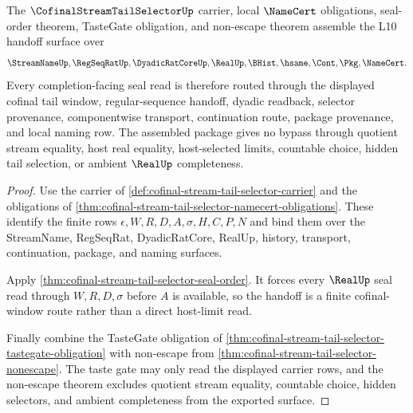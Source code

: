 \begin{theorem}
\label{thm:cofinal-stream-tail-selector-obligation-package}
The $\CofinalStreamTailSelectorUp$ carrier, local $\NameCert$ obligations, seal-order theorem, TasteGate obligation, and non-escape theorem assemble the L10 handoff surface over
$$
\StreamNameUp,\RegSeqRatUp,\DyadicRatCoreUp,\RealUp,\BHist,\hsame,\Cont,\Pkg,\NameCert.
$$
Every completion-facing seal read is therefore routed through the displayed cofinal tail window, regular-sequence handoff, dyadic readback, selector provenance, componentwise transport, continuation route, package provenance, and local naming row. The assembled package gives no bypass through quotient stream equality, host real equality, host-selected limits, countable choice, hidden tail selection, or ambient $\RealUp$ completeness.
\end{theorem}
\begin{proof}
Use the carrier of \autoref{def:cofinal-stream-tail-selector-carrier} and the obligations of \autoref{thm:cofinal-stream-tail-selector-namecert-obligations}. These identify the finite rows $\epsilon,W,R,D,A,\sigma,H,C,P,N$ and bind them over the StreamName, RegSeqRat, DyadicRatCore, RealUp, history, transport, continuation, package, and naming surfaces.

Apply \autoref{thm:cofinal-stream-tail-selector-seal-order}. It forces every $\RealUp$ seal read through $W,R,D,\sigma$ before $A$ is available, so the handoff is a finite cofinal-window route rather than a direct host-limit read.

Finally combine the TasteGate obligation of \autoref{thm:cofinal-stream-tail-selector-tastegate-obligation} with non-escape from \autoref{thm:cofinal-stream-tail-selector-nonescape}. The taste gate may only read the displayed carrier rows, and the non-escape theorem excludes quotient stream equality, countable choice, hidden selectors, and ambient completeness from the exported surface.
\end{proof}

